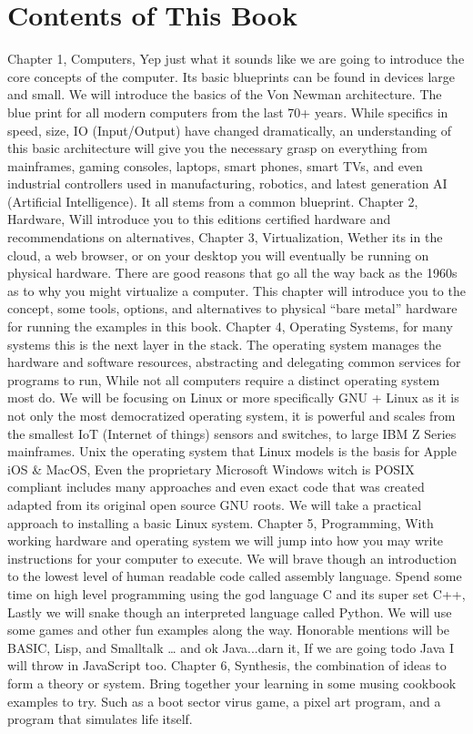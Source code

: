\section{Contents of This Book}

Chapter 1, Computers, Yep just what it sounds like we are going to introduce the core concepts of the computer. Its basic blueprints can be found in devices large and small. We will introduce the basics of the Von Newman architecture. The blue print for all modern computers from the last 70+ years. While specifics in speed, size, IO (Input/Output) have changed dramatically, an understanding of this basic architecture will give you the necessary grasp on everything from mainframes, gaming consoles, laptops, smart phones, smart TVs, and even industrial controllers used in manufacturing, robotics, and latest generation AI (Artificial Intelligence). It all stems from a common blueprint.
Chapter 2, Hardware, Will introduce you to this editions certified hardware and recommendations on alternatives, 
Chapter 3, Virtualization, Wether its in the cloud, a web browser, or on your desktop you will eventually be running on physical hardware. There are good reasons that go all the way back as the 1960s as to why you might virtualize a computer. This chapter will introduce you to the concept, some tools, options, and alternatives to physical “bare metal” hardware for running the examples in this book. 
Chapter 4, Operating Systems, for many systems this is the next layer in the stack. The operating system manages the hardware and software resources, abstracting and delegating common services for programs to run, While not all computers require a distinct operating system most do. We will be focusing on Linux or more specifically GNU + Linux as it is not only the most democratized operating system, it is powerful and scales from the smallest IoT (Internet of things) sensors and switches, to large IBM Z Series mainframes. Unix the operating system that Linux models is the basis for Apple iOS & MacOS, Even the proprietary Microsoft Windows witch is POSIX compliant includes many approaches and even exact code that was created adapted from its original open source GNU roots. We will take a practical approach to installing a basic Linux system.
Chapter 5, Programming, With working hardware and operating system we will jump into how you may write instructions for your computer to execute. We will brave though an introduction to the lowest level of human readable code called assembly language. Spend some time on high level programming using the god language C and its super set C++, Lastly we will snake though an interpreted language called Python. We will use some games and other fun examples along the way. Honorable mentions will be BASIC, Lisp, and Smalltalk … and ok Java...darn it, If we are going todo Java I will throw in JavaScript too.
Chapter 6, Synthesis, the combination of ideas to form a theory or system. Bring together your learning in some musing cookbook examples to try. Such as a boot sector virus game, a pixel art program, and a program that simulates life itself.
